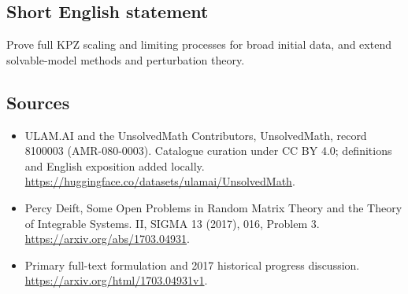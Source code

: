 \documentclass[11pt]{article}
\begin{document}
\subsection{Short English statement}
Prove full KPZ scaling and limiting processes for broad initial data, and extend solvable-model methods and perturbation theory.
\subsection{Sources}
\begin{itemize}
\item[\hypertarget{source:8100003:1}{S1}] ULAM.AI and the UnsolvedMath Contributors, UnsolvedMath, record 8100003 (AMR-080-0003). Catalogue curation under CC BY 4.0; definitions and English exposition added locally.
\url{https://huggingface.co/datasets/ulamai/UnsolvedMath}.
\item[\hypertarget{source:8100003:2}{S2}] Percy Deift, Some Open Problems in Random Matrix Theory and the Theory of Integrable Systems. II, SIGMA 13 (2017), 016, Problem 3.
\url{https://arxiv.org/abs/1703.04931}.
\item[\hypertarget{source:8100003:3}{S3}] Primary full-text formulation and 2017 historical progress discussion.
\url{https://arxiv.org/html/1703.04931v1}.
\end{itemize}
\label{end:8100003}
\end{document}
